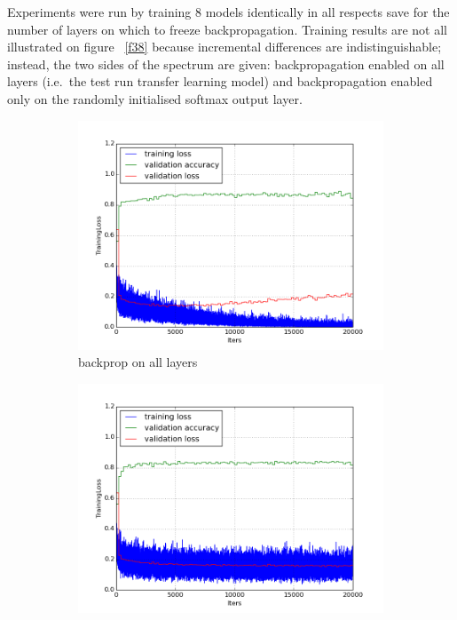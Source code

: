 \documentclass[a4paper,11pt]{article}
\begin{document}
Experiments were run by training 8 models identically in all respects save for the number of layers on which to freeze backpropagation. Training results are not all illustrated on figure ~\ref{f38} because incremental differences are indistinguishable; instead, the two sides of the spectrum are given: backpropagation enabled on all layers (i.e.\ the test run transfer learning model) and backpropagation enabled only on the randomly initialised softmax output layer. 

\begin{figure}
    \centering
    \begin{minipage}[b]{\textwidth}
      \begin{subfigure}{.5\textwidth} 
        \centering
        \includegraphics[scale=0.4]{images/plot_clampdet_none.png}
        \caption{backprop on all layers}\label{fig:2a}
      \end{subfigure}%
      \begin{subfigure}{.5\textwidth} 
        \centering
        \includegraphics[scale=0.4]{images/plot_clampdet_fc7.png}

\end{subfigure}
\end{minipage}
\end{figure}
\end{document}
